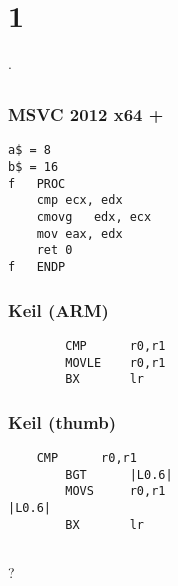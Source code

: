 \chapter{ 1}

.

\section{}

\subsection{MSVC 2012 x64 + \Ox}

\begin{lstlisting}
a$ = 8
b$ = 16
f	PROC
	cmp	ecx, edx
	cmovg	edx, ecx
	mov	eax, edx
	ret	0
f	ENDP
\end{lstlisting}

\subsection{Keil (ARM)}

\begin{lstlisting}
        CMP      r0,r1
        MOVLE    r0,r1
        BX       lr
\end{lstlisting}

\subsection{Keil (thumb)}
        
\begin{lstlisting}
	CMP      r0,r1
        BGT      |L0.6|
        MOVS     r0,r1
|L0.6|
        BX       lr
\end{lstlisting}

\section{}

 \LOOP {}?

\section{}

